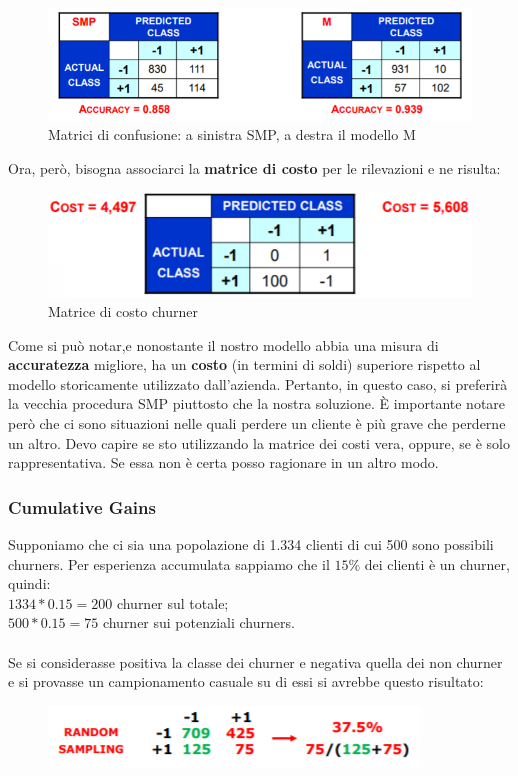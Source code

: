 \begin{figure}[H]
	\centering
	\includegraphics[width=\linewidth]{classification/pict/esConfMatr.png}
	\caption{Matrici di confusione: a sinistra SMP, a destra il modello M}
\end{figure}
Ora, però, bisogna associarci la \textbf{matrice di costo} per le rilevazioni e ne risulta:
\begin{figure}[H]
	\centering
	\includegraphics[height=0.2 \linewidth]{classification/pict/esMatrCosto.png}
	\caption{Matrice di costo churner}
\end{figure}
Come si può notar,e nonostante il nostro modello abbia una misura di \textbf{accuratezza} migliore, ha un \textbf{costo} (in termini di soldi) superiore rispetto al modello storicamente utilizzato dall'azienda. Pertanto, in questo caso, si preferirà la vecchia procedura SMP piuttosto che la nostra soluzione.
\`E importante notare però che ci sono situazioni nelle quali perdere un cliente è più grave che perderne un altro. Devo capire se sto utilizzando la matrice dei costi vera, oppure, se è solo rappresentativa. Se essa non è certa posso ragionare in un altro modo.

\subsubsection{Cumulative Gains} 
Supponiamo che ci sia una popolazione di 1.334 clienti di cui 500 sono possibili churners. Per esperienza accumulata sappiamo che il $15\%$ dei clienti è un churner, quindi:
\\$1334*0.15 = 200$ churner sul totale;
\\$500*0.15 = 75$ churner sui potenziali churners.
\\\\
Se si considerasse positiva la classe dei churner e negativa quella dei non churner e si provasse un campionamento casuale su di essi si avrebbe questo risultato:
\begin{figure}[H]
	\centering
	\includegraphics[height=0.1 \linewidth]{classification/pict/esChurnerRandom.png}
\end{figure}

